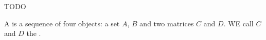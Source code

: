 

TODO


A  is
a sequence of four objects:
a set $A$, $B$ and two matrices
$C$ and $D$.
WE call $C$ and $D$ the
.
